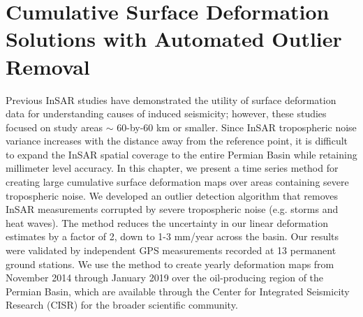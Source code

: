 \chapter{Cumulative Surface Deformation Solutions with Automated Outlier Removal}
\label{CHAP:4-GRL}



Previous InSAR studies have demonstrated the utility of surface deformation data for understanding causes of induced seismicity; however, these studies focused on study areas $ \sim $ 60-by-60 km or smaller. 
Since InSAR tropospheric noise variance increases with the distance away from the reference point, it is difficult to expand the InSAR spatial coverage to the entire Permian Basin while retaining millimeter level accuracy.  
In this chapter, we present a time series method for creating large cumulative surface deformation maps over areas containing severe tropospheric noise. 
We developed an outlier detection algorithm that removes InSAR measurements corrupted by severe tropospheric noise (e.g. storms and heat waves).
The method reduces the uncertainty in our linear deformation estimates by a factor of 2, down to 1-3 mm/year across the basin. Our results were validated by independent GPS measurements recorded at 13 permanent ground stations. 
We use the method to create yearly deformation maps from November 2014 through January 2019 over the oil-producing region of the Permian Basin, which are available through the Center for Integrated Seismicity Research (CISR) for the broader scientific community. 



